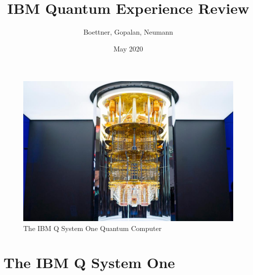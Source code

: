 \documentclass[12pt]{article}
\title{IBM Quantum Experience Review}
\author{Boettner, Gopalan, Neumann}
\date{May 2020}
\begin{document}
\maketitle
\begin{figure}[h!]
        \centering
        \includegraphics[width=\linewidth]{Circuits/ibm-q.jpg}
        \caption{The IBM Q System One Quantum Computer}
    \end{figure}
    \newpage
\section{The IBM Q System One}
    
\end{document}
